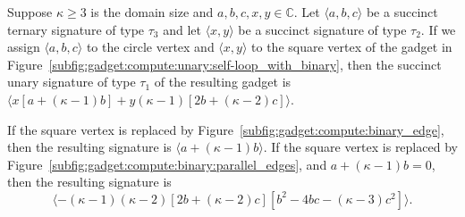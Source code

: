\documentclass[11pt]{article}
\begin{document}
\begin{lemma} \label{lem:compute:unary:construct_<1>}
 Suppose $\kappa \ge 3$ is the domain size and $a,b,c,x,y \in \mathbb{C}$.
 Let $\langle a,b,c \rangle$ be a succinct ternary signature of type $\tau_3$ and let $\langle x,y \rangle$ be a succinct signature of type $\tau_2$.
 If we assign $\langle a,b,c \rangle$ to the circle vertex and $\langle x,y \rangle$ to the square vertex of the gadget in Figure~\ref{subfig:gadget:compute:unary:self-loop_with_binary},
 then the succinct unary signature of type $\tau_1$ of the resulting gadget is $\langle x [a + (\kappa - 1) b] + y (\kappa - 1) [2 b + (\kappa - 2) c] \rangle$.
 
 If the square vertex is replaced by Figure~\ref{subfig:gadget:compute:binary_edge},
 then the resulting signature is $\langle a + (\kappa - 1) b \rangle$.
 If the square vertex is replaced by Figure~\ref{subfig:gadget:compute:binary:parallel_edges}, and $a + (\kappa - 1) b = 0$,
 then the resulting signature is
 \begin{equation} \label{eqn:compute:unary:construct_<1>}
  \langle -(\kappa - 1) (\kappa - 2) [2 b + (\kappa - 2) c] [b^2 - 4 b c - (\kappa - 3) c^2] \rangle.
 \end{equation}
\end{lemma}
\end{document}

